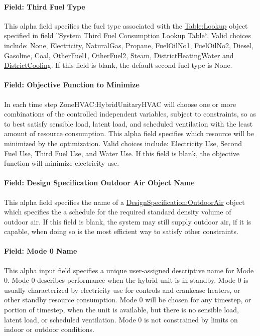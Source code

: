\paragraph{Field: Third Fuel Type}
This alpha field specifies the fuel type associated with the \hyperref[tablelookup]{Table:Lookup} object specified in field ''System Third Fuel Consumption Lookup Table``. Valid choices include: None, Electricity, NaturalGas, Propane, FuelOilNo1, FuelOilNo2, Diesel, Gasoline, Coal, OtherFuel1, OtherFuel2, Steam, \hyperref[districtheating]{DistrictHeatingWater} and \hyperref[districtcooling]{DistrictCooling}. If this field is blank, the default second fuel type is None.

\paragraph{Field: Objective Function to Minimize}
In each time step ZoneHVAC:HybridUnitaryHVAC will choose one or more combinations of the controlled independent variables, subject to constraints, so as to best satisfy sensible load, latent load, and scheduled ventilation with the least amount of resource consumption. This alpha field specifies which resource will be minimized by the optimization.  Valid choices include: Electricity Use, Second Fuel Use, Third Fuel Use, and Water Use.  If this field is blank, the objective function will minimize electricity use.


\paragraph{Field: Design Specification Outdoor Air Object Name}
This alpha field specifies the name of a \hyperref[designspecificationoutdoorair]{DesignSpecification:OutdoorAir} object which specifies the a schedule for the required standard density volume of outdoor air. If this field is blank, the system may still supply outdoor air, if it is capable, when doing so is the most efficient way to satisfy other constraints.

\paragraph{Field: Mode 0 Name}
This alpha input field specifies a unique user-assigned descriptive name for Mode 0. Mode 0 describes performance when the hybrid unit is in standby. Mode 0 is usually characterized by electricity use for controls and crankcase heaters, or other standby resource consumption. Mode 0 will be chosen for any timestep, or portion of timestep, when the unit is available, but there is no sensible load, latent load, or scheduled ventilation. Mode 0 is not constrained by limits on indoor or outdoor conditions.

